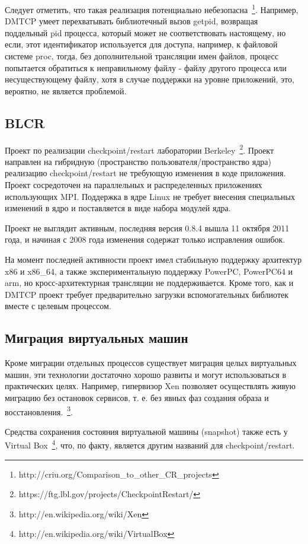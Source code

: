 Следует отметить, что такая реализация потенциально небезопасна~\footnote{http://criu.org/Comparison\_to\_other\_CR\_projects}. Например, DMTCP умеет перехватывать библиотечный вызов getpid, возвращая поддельный pid процесса, который может не соответствовать настоящему, но если, этот идентификатор используется для доступа, например, к файловой системе proc, тогда, без дополнительной трансляции имен файлов, процесс попытается обратиться к неправильному файлу - файлу другого процесса или несуществующему файлу, хотя в случае поддержки на уровне приложений, это, вероятно, не является проблемой.

\subsection{BLCR}

Проект по реализации checkpoint/restart лаборатории Berkeley~\footnote{https://ftg.lbl.gov/projects/CheckpointRestart/}. Проект направлен на гибридную (пространство пользователя/пространство ядра) реализацию checkpoint/restart не требующую изменения в коде приложения. Проект сосредоточен на параллельных и распределенных приложениях использующих MPI. Поддержка в ядре Linux не требует внесения специальных изменений в ядро и поставляется в виде набора модулей ядра.

Проект не выглядит активным, последняя версия 0.8.4 вышла 11 октября 2011 года, и начиная с 2008 года изменения содержат только исправления ошибок.

На момент последней активности проект имел стабильную поддержку архитектур x86 и x86\_64, а также экспериментальную поддержку PowerPC, PowerPC64 и arm, но кросс-архитектурная трансляции не поддерживается. Кроме того, как и DMTCP проект требует предварительно загрузки вспомогательных библиотек вместе с целевым процессом.

\subsection{Миграция виртуальных машин}

Кроме миграции отдельных процессов существует миграция целых виртуальных машин, эти технологии достаточно хорошо развиты и могут использоваться в практических целях. Например, гипервизор Xen позволяет осуществлять живую миграцию без остановок сервисов, т. е. без явных фаз создания образа и восстановления.~\footnote{http://en.wikipedia.org/wiki/Xen}.

Средства сохранения состояния виртуальной машины (snapshot) также есть у Virtual Box~\footnote{http://en.wikipedia.org/wiki/VirtualBox}, что, по факту, является другим названий для checkpoint/restart.

